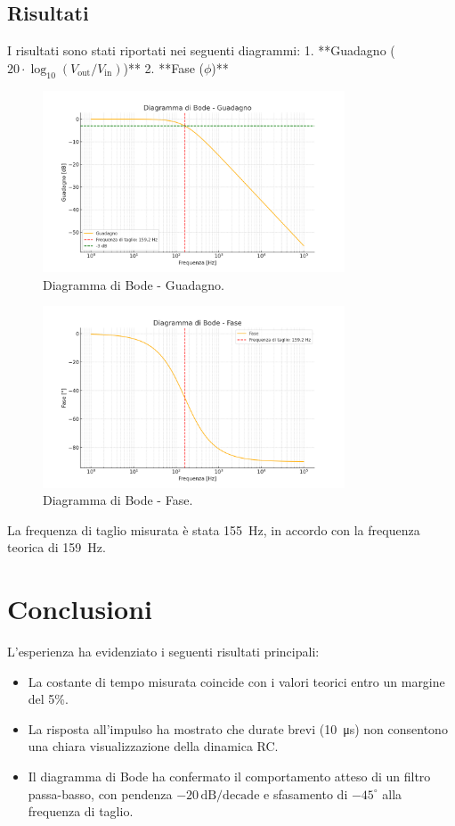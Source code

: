 \documentclass[a4paper,11pt]{article}
\begin{document}
\subsection*{Risultati}
I risultati sono stati riportati nei seguenti diagrammi:  
1. **Guadagno (\(20 \cdot \log_{10}(V_\text{out}/V_\text{in})\))**  
2. **Fase (\(\phi\))**  

\begin{figure}[H]
\centering
\includegraphics[width=0.8\textwidth]{assets/bode_gain.png}
\caption{Diagramma di Bode - Guadagno.}
\end{figure}

\begin{figure}[H]
\centering
\includegraphics[width=0.8\textwidth]{assets/bode_phase.png}
\caption{Diagramma di Bode - Fase.}
\end{figure}

La frequenza di taglio misurata è stata \SI{155}{\hertz}, in accordo con la frequenza teorica di \SI{159}{\hertz}.


\section*{Conclusioni}
L’esperienza ha evidenziato i seguenti risultati principali:
\begin{itemize}
    \item La costante di tempo misurata coincide con i valori teorici entro un margine del 5\%.
    \item La risposta all'impulso ha mostrato che durate brevi (\SI{10}{\micro\second}) non consentono una chiara visualizzazione della dinamica RC.
    \item Il diagramma di Bode ha confermato il comportamento atteso di un filtro passa-basso, con pendenza \(-20 \, \mathrm{dB/decade}\) e sfasamento di \(-45^\circ\) alla frequenza di taglio.
\end{itemize}
\end{document}
